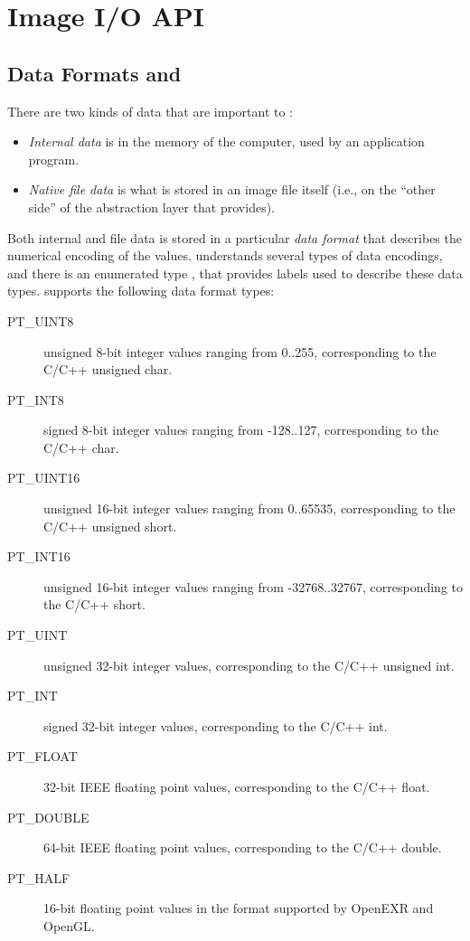 \chapter{Image I/O API}
\label{chap:imageioapi}



\section{Data Formats and \ParamBaseType}
\label{sec:dataformats}
\label{sec:ParamBaseType}

There are two kinds of data that are important to \product:

\begin{itemize}
\item \emph{Internal data} is in the memory of the computer, used by an
  application program.
\item \emph{Native file data} is what is stored in an image file itself
  (i.e., on the ``other side'' of the abstraction layer that \product
  provides).
\end{itemize}

Both internal and file data is stored in a particular \emph{data format}
that describes the numerical encoding of the values.  \product
understands several types of data encodings, and there is an enumerated
type \ParamBaseType, that provides labels used to describe these data
types.  \product supports the following data format types:

\begin{description}
\item[\halfspc\rm {\cf PT_UINT8}] unsigned 8-bit integer values ranging from
  0..255, corresponding to the C/C++ {\kw unsigned char}.
\item[\halfspc\rm {\cf PT_INT8}] signed 8-bit integer values ranging from
  -128..127, corresponding to the C/C++ {\kw char}.
\item[\halfspc\rm {\cf PT_UINT16}] unsigned 16-bit integer values ranging
  from 0..65535, corresponding to the C/C++ {\kw unsigned short}.
\item[\halfspc\rm {\cf PT_INT16}] unsigned 16-bit integer values ranging
  from -32768..32767, corresponding to the C/C++ {\kw short}.
\item[\halfspc\rm {\cf PT_UINT}] unsigned 32-bit integer values,
  corresponding to the C/C++ {\kw unsigned int}.
\item[\halfspc\rm {\cf PT_INT}] signed 32-bit integer values, corresponding
  to the C/C++ {\kw int}.
\item[\halfspc\rm {\cf PT_FLOAT}] 32-bit IEEE floating point values,
  corresponding to the C/C++ {\kw float}.
\item[\halfspc\rm {\cf PT_DOUBLE}] 64-bit IEEE floating point values,
  corresponding to the C/C++ {\kw double}.
\item[\halfspc\rm {\cf PT_HALF}] 16-bit floating point values in the format
  supported by OpenEXR and OpenGL.
\end{description}

